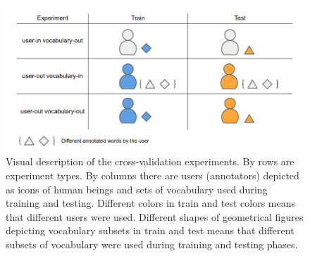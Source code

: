 \begin{figure}[h]
    \centering
    \includegraphics[width=14cm]{Images/Experiments.png}
    \caption{Visual description of the cross-validation experiments. By rows are experiment types. By columns there are users (annotators) depicted as icons of human beings and sets of vocabulary used during training and testing. Different colors in train and test colors means that different users were used. Different shapes of geometrical figures depicting vocabulary subsets in train and test means that different subsets of vocabulary were used during training and testing phases.}
    \label{fig:experiments-description}
\end{figure} 

